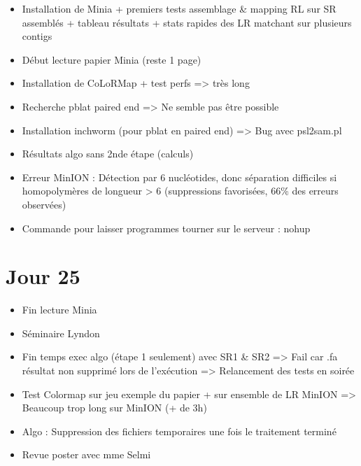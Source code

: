 \documentclass[12pt]{report}
\begin{document}
\begin{itemize}
  \item Installation de Minia + premiers tests assemblage \& mapping RL sur SR assemblés + tableau résultats + stats rapides des LR matchant sur plusieurs contigs

  \item Début lecture papier Minia (reste 1 page)

  \item Installation de CoLoRMap + test perfs  => très long

  \item Recherche pblat paired end => Ne semble pas être possible

  \item Installation inchworm (pour pblat en paired end) => Bug avec psl2sam.pl

  \item Résultats algo sans 2nde étape (calculs)

  \item Erreur MinION : Détection par 6 nucléotides, donc séparation difficiles si homopolymères de longueur > 6 (suppressions favorisées, 66\% des erreurs observées)

  \item Commande pour laisser programmes tourner sur le serveur : nohup
\end{itemize}

\section{Jour 25}

\begin{itemize}
  \item Fin lecture Minia

  \item Séminaire Lyndon

  \item Fin temps exec algo (étape 1 seulement) avec SR1 \& SR2 => Fail car .fa résultat non supprimé lors de l'exécution => Relancement des tests en soirée

  \item Test Colormap sur jeu exemple du papier + sur ensemble de LR MinION => Beaucoup trop long sur MinION (+ de 3h)

  \item Algo : Suppression des fichiers temporaires une fois le traitement terminé

  \item Revue poster avec mme Selmi
\end{itemize}
\end{document}
